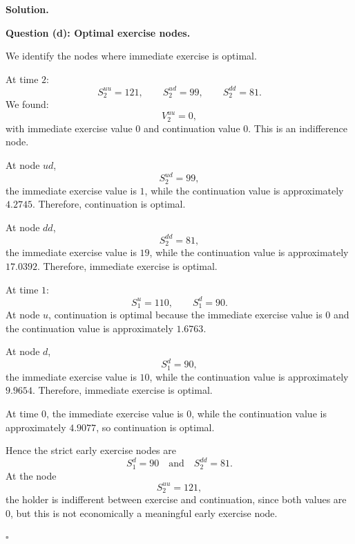 \documentclass[11pt]{article}
\theoremstyle{plain}
\newcommand{\1}{\mathbf{1}}
\theoremstyle{definition}
\newenvironment{solution}
{\par\medskip\noindent\textbf{Solution.}\par\medskip}
{\hfill$\square$\par\medskip}
\newenvironment{solutionpart}[1]
{\par\medskip\noindent\textbf{#1.}\par\smallskip}
{\par\medskip}
\begin{document}
\begin{solution}
\begin{solutionpart}{Question (d): Optimal exercise nodes}

We identify the nodes where immediate exercise is optimal.

At time $2$:
\[
S_2^{uu}=121,
\qquad
S_2^{ud}=99,
\qquad
S_2^{dd}=81.
\]
We found:
\[
V_2^{uu}=0,
\]
with immediate exercise value $0$ and continuation value $0$.
This is an indifference node.

At node $ud$,
\[
S_2^{ud}=99,
\]
the immediate exercise value is $1$, while the continuation value is approximately $4.2745$. Therefore, continuation is optimal.

At node $dd$,
\[
S_2^{dd}=81,
\]
the immediate exercise value is $19$, while the continuation value is approximately $17.0392$. Therefore, immediate exercise is optimal.

At time $1$:
\[
S_1^u=110,
\qquad
S_1^d=90.
\]
At node $u$, continuation is optimal because the immediate exercise value is $0$ and the continuation value is approximately $1.6763$.

At node $d$,
\[
S_1^d=90,
\]
the immediate exercise value is $10$, while the continuation value is approximately $9.9654$. Therefore, immediate exercise is optimal.

At time $0$, the immediate exercise value is $0$, while the continuation value is approximately $4.9077$, so continuation is optimal.

Hence the strict early exercise nodes are
\[
\boxed{
S_1^d=90
\quad\text{and}\quad
S_2^{dd}=81.
}
\]
At the node
\[
S_2^{uu}=121,
\]
the holder is indifferent between exercise and continuation, since both values are $0$, but this is not economically a meaningful early exercise node.
\end{solutionpart}
\end{solution}
\end{document}
